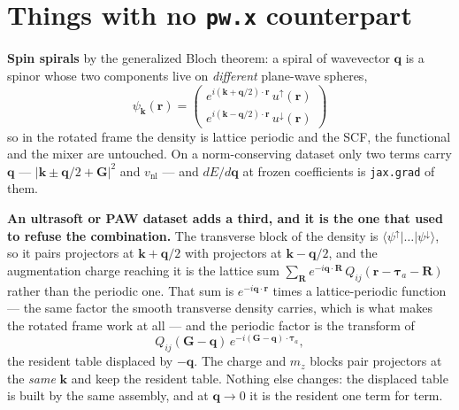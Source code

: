 \documentclass[11pt,a4paper]{article}
\newcommand{\code}[1]{\texttt{\small #1}}
\begin{document}
\section{Things with no \texorpdfstring{\code{pw.x}}{pw.x} counterpart}

\textbf{Spin spirals} by the generalized Bloch theorem: a spiral of wavevector
$\mathbf q$ is a spinor whose two components live on \emph{different} plane-wave
spheres,
\begin{equation*}
\psi_{\mathbf k}(\mathbf r) = \begin{pmatrix}
  e^{i(\mathbf k + \mathbf q/2)\cdot\mathbf r}\,u^{\uparrow}(\mathbf r) \\[3pt]
  e^{i(\mathbf k - \mathbf q/2)\cdot\mathbf r}\,u^{\downarrow}(\mathbf r)
\end{pmatrix}
\end{equation*}
so in the rotated frame the density is lattice periodic and the SCF, the
functional and the mixer are untouched. On a norm-conserving dataset only two
terms carry $\mathbf q$ --- $|\mathbf k \pm \mathbf q/2 + \mathbf G|^2$ and
$v_{\mathrm{nl}}$ --- and $dE/d\mathbf q$ at frozen coefficients is
\code{jax.grad} of them.

\textbf{An ultrasoft or PAW dataset adds a third, and it is the one that used to
refuse the combination.} The transverse block of the density is
$\langle\psi^{\uparrow}|\ldots|\psi^{\downarrow}\rangle$, so it pairs projectors
at $\mathbf k + \mathbf q/2$ with projectors at $\mathbf k - \mathbf q/2$, and
the augmentation charge reaching it is the lattice sum
$\sum_{\mathbf R} e^{-i\mathbf q\cdot\mathbf R}\,
Q_{ij}(\mathbf r - \boldsymbol\tau_a - \mathbf R)$
rather than the periodic one. That sum is $e^{-i\mathbf q\cdot\mathbf r}$ times
a lattice-periodic function --- the same factor the smooth transverse density
carries, which is what makes the rotated frame work at all --- and the periodic
factor is the transform of
\begin{equation*}
Q_{ij}(\mathbf G - \mathbf q)\, e^{-i(\mathbf G - \mathbf q)\cdot\boldsymbol\tau_a},
\end{equation*}
the resident table displaced by $-\mathbf q$. The charge and $m_z$ blocks pair
projectors at the \emph{same} $\mathbf k$ and keep the resident table. Nothing
else changes: the displaced table is built by the same assembly, and at
$\mathbf q \to 0$ it is the resident one term for term.
\end{document}
